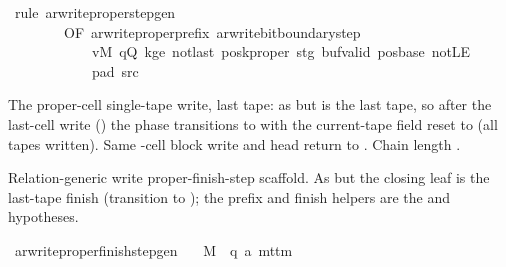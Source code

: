 \begin{isabellebody}
\ {\isacharparenleft}{\kern0pt}rule\ ar{\isacharunderscore}{\kern0pt}write{\isacharunderscore}{\kern0pt}proper{\isacharunderscore}{\kern0pt}step{\isacharunderscore}{\kern0pt}gen\isanewline
\ \ \ \ \ \ \ \ {\isacharbrackleft}{\kern0pt}OF\ ar{\isacharunderscore}{\kern0pt}write{\isacharunderscore}{\kern0pt}proper{\isacharunderscore}{\kern0pt}prefix\ ar{\isacharunderscore}{\kern0pt}write{\isacharunderscore}{\kern0pt}bit{\isacharunderscore}{\kern0pt}boundary{\isacharunderscore}{\kern0pt}step\isanewline
\ \ \ \ \ \ \ \ \ \ \ \ vM\ qQ\ kge{}\ notlast\ poskproper\ stg\ buf{\isacharunderscore}{\kern0pt}valid\ pos{\isacharunderscore}{\kern0pt}base\ notLE\isanewline
\ \ \ \ \ \ \ \ \ \ \ \ pad{}\ src{}{\isacharbrackright}{\kern0pt}{\isacharparenright}{\kern0pt}%
\endisatagproof
{\isafoldproof}%
%
\isadelimproof
%
\endisadelimproof
%
\begin{isamarkuptext}%
The proper-cell single-tape write, last tape: as
   but  is the last tape, so after
  the last-cell write () the phase
  transitions to  with the current-tape field reset
  to  (all tapes written).  Same -cell block
  write and head return to .  Chain length .%
\end{isamarkuptext}\isamarkuptrue%
%
\begin{isamarkuptext}%
Relation-generic write proper-finish-step scaffold.  As
   but the closing leaf is the
  last-tape finish (transition to ); the prefix
  and finish helpers are the  and
   hypotheses.%
\end{isamarkuptext}\isamarkuptrue%
\isamarkupfalse%
\ ar{\isacharunderscore}{\kern0pt}write{\isacharunderscore}{\kern0pt}proper{\isacharunderscore}{\kern0pt}finish{\isacharunderscore}{\kern0pt}step{\isacharunderscore}{\kern0pt}gen{\isacharcolon}{\kern0pt}\isanewline
\ \ \ M\ {\isacharcolon}{\kern0pt}{\isacharcolon}{\kern0pt}\ {\isachardoublequoteopen}{\isacharparenleft}{\kern0pt}{\isacharprime}{\kern0pt}q{\isacharcomma}{\kern0pt}\ {\isacharprime}{\kern0pt}a{\isacharparenright}{\kern0pt}\ mttm{\isachardoublequoteclose}\isanewline

\end{isabellebody}
